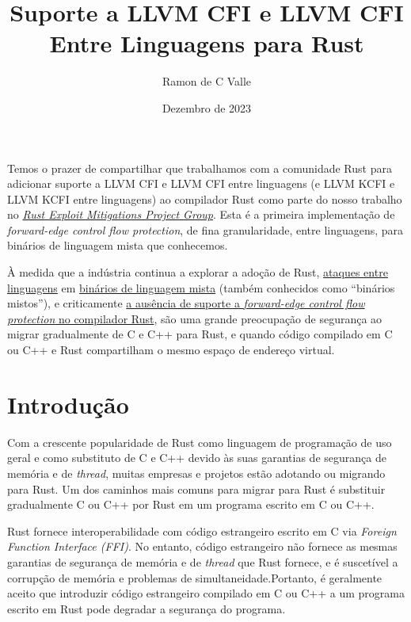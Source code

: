 \documentclass{article}
\title{Suporte a LLVM CFI e LLVM CFI Entre Linguagens para Rust}
\author{Ramon de C Valle}
\date{Dezembro de 2023}
\begin{document}
   \maketitle

Temos o prazer de compartilhar que trabalhamos com a comunidade Rust para adicionar suporte a LLVM CFI e LLVM CFI entre linguagens (e LLVM KCFI e LLVM KCFI entre linguagens) ao compilador Rust como parte do nosso trabalho no \href{https://www.rust-lang.org/governance/teams/compiler#Exploit%20Mitigations%20Project%20Group}{\textit{Rust Exploit Mitigations Project Group}}. Esta é a primeira implementação de \textit{forward-edge control flow protection}, de fina granularidade, entre linguagens, para binários de linguagem mista que conhecemos.

À medida que a indústria continua a explorar a adoção de Rust, \href{https://www.ndss-symposium.org/wp-content/uploads/2022-78-paper.pdf}{ataques entre linguagens} em \href{https://dl.acm.org/doi/pdf/10.1145/3418898}{binários de linguagem mista} (também conhecidos como “binários mistos”), e criticamente \href{https://rcvalle.com/docs/rust-cfi-design-doc.pdf}{a ausência de suporte a \textit{forward-edge control flow protection} no compilador Rust}, são uma grande preocupação de segurança ao migrar gradualmente de C e C++ para Rust, e quando código compilado em C ou C++ e Rust compartilham o mesmo espaço de endereço virtual.


\section{Introdução}

Com a crescente popularidade de Rust como linguagem de programação de uso geral e como substituto de C e C++ devido às suas garantias de segurança de memória e de \textit{thread}, muitas empresas e projetos estão adotando ou migrando para Rust. Um dos caminhos mais comuns para migrar para Rust é substituir gradualmente C ou C++ por Rust em um programa escrito em C ou C++.

Rust fornece interoperabilidade com código estrangeiro escrito em C via \textit{Foreign Function Interface (FFI)}. No entanto, código estrangeiro não fornece as mesmas garantias de segurança de memória e de \textit{thread} que Rust fornece, e é suscetível a corrupção de memória e problemas de simultaneidade.\footnotemark[1] Portanto, é geralmente aceito que introduzir código estrangeiro compilado em C ou C++ a um programa escrito em Rust pode degradar a segurança do programa.
\end{document}
